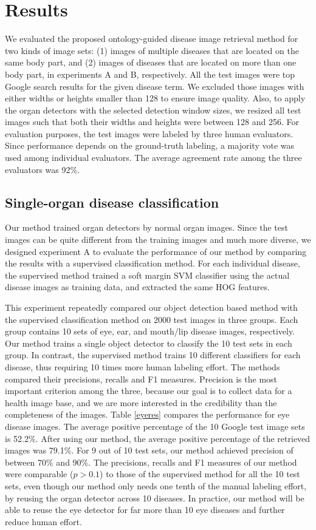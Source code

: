\section{Results}
We evaluated the proposed ontology-guided disease image
retrieval method for two kinds of image sets: (1) images of multiple
diseases that are located on the same body part, and (2)
images of diseases that are located on more than one body part,
in experiments A and B, respectively. All the test images were
top Google search results for the given disease term. We
excluded those images with either widths or heights smaller
than 128 to ensure image quality. Also, to apply the organ
detectors with the selected detection window sizes, we resized
all test images such that both their widths and heights were
between 128 and 256. For evaluation purposes, the test images
were labeled by three human evaluators. Since performance
depends on the ground-truth labeling, a majority vote was used
among individual evaluators. The average agreement rate among
the three evaluators was 92\%.

\subsection{Single-organ disease classification}
Our method trained organ detectors by normal organ images.
Since the test images can be quite different from the training
images and much more diverse, we designed experiment A to
evaluate the performance of our method by comparing the
results with a supervised classification method. For each individual
disease, the supervised method trained a soft margin SVM
classifier using the actual disease images as training data, and
extracted the same HOG features.

This experiment repeatedly compared our object detection based
method with the supervised classification method on
2000 test images in three groups. Each group contains 10 sets
of eye, ear, and mouth/lip disease images, respectively. Our
method trains a single object detector to classify the 10 test sets
in each group. In contrast, the supervised method trains 10 different
classifiers for each disease, thus requiring 10 times more
human labeling effort. The methods compared their precisions,
recalls and F1 measures. Precision is the most important criterion
among the three, because our goal is to collect data for a
health image base, and we are more interested in the credibility
than the completeness of the images. Table \ref{eyeres} compares the performance
for eye disease images. The average positive percentage
of the 10 Google test image sets is 52.2\%. After using our
method, the average positive percentage of the retrieved images
was 79.1\%. For 9 out of 10 test sets, our method achieved precision
of between 70\% and 90\%. The precisions, recalls and F1
measures of our method were comparable ($p>0.1$) to those of
the supervised method for all the 10 test sets, even though our
method only needs one tenth of the manual labeling effort, by
reusing the organ detector across 10 diseases. In practice, our
method will be able to reuse the eye detector for far more than
10 eye diseases and further reduce human effort.

